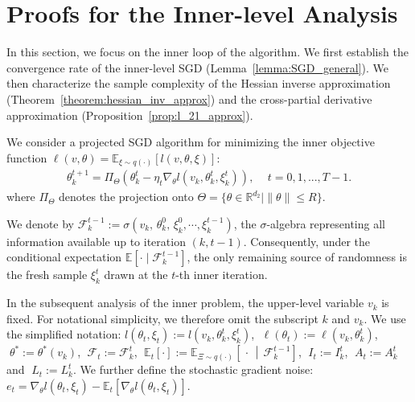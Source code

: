 \documentclass[11 pt]{article}
\begin{document}
\newpage
\section{Proofs for the Inner-level Analysis}\label{app:inner}
In this section, we focus on the inner loop of the algorithm.  We first establish the convergence rate of the inner-level SGD (Lemma~\ref{lemma:SGD_general}).  We then characterize the sample complexity of the Hessian inverse approximation (Theorem~\ref{theorem:hessian_inv_approx}) and the cross-partial derivative approximation (Proposition~\ref{prop:l_21_approx}).


We consider a projected SGD algorithm for minimizing the inner objective function $\ell (v,\theta)=\mathbb{E}_{\xi\sim q(\cdot)}\left[ l(v,\theta,\xi)\right]$:
\begin{align}\label{eq:SGD_general}
    \theta_k^{t+1}=\Pi_{\Theta}\left(\theta_k^t-\eta_t \nabla_\theta l(v_k,\theta_k^t,\xi_k^t)\right),\quad \,t=0,1,...,T-1.
\end{align}
where $\Pi_\Theta$ denotes the projection onto $\Theta=\{\theta\in\mathbb{R}^{d_2}\mid \|\theta\|\leq R\}$. 

We denote by $\mathcal{F}_k^{t-1} := \sigma\!\left( v_k,\, \theta_k^0,\, \xi_k^0,\cdots,\xi_k^{t-1} \right)$, 
the $\sigma$-algebra representing all information available up to iteration $(k,t-1)$. Consequently, under the conditional expectation 
$\mathbb{E}\!\left[\cdot \mid \mathcal{F}_k^{t-1}\right]$, 
the only remaining source of randomness is the fresh sample $\xi_k^{t}$ drawn at the 
$t$-th inner iteration.

In the subsequent analysis of the inner problem, the upper-level variable $v_k$ is fixed. For notational simplicity, we therefore omit the subscript $k$ and $v_k$. We use the simplified notation: $l(\theta_t,\xi_t) := l(v_k,\theta_k^t,\xi_k^t)$, $\;\ell(\theta_t):=\ell(v_k,\theta_k^t)$,
$\;\theta^*:=\theta^*(v_k)$,
$\;\mathcal{F}_{t}:=\mathcal{F}_k^t$,
$\;\mathbb{E}_{t}[\cdot] :=
\mathbb{E}_{\Xi\sim q(\cdot)}\!\left[\,\cdot\,\middle|\,\mathcal{F}_{k}^{t-1}\right]$,
$\;I_t:=I_k^t$,
$\;A_t:=A_k^t$ and $\;L_t:=L_k^t$. We further define the stochastic gradient noise: $e_t = \nabla_\theta l(\theta_t,\xi_t) - \mathbb{E}_{t}[\nabla_\theta l(\theta_{t},\xi_t)]$.
\end{document}
